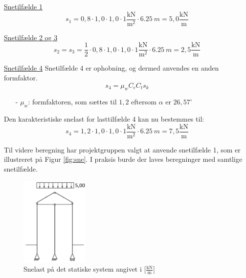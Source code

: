 \underline{Snetilfælde 1}
\begin{equation}
	s_1 = 0,\!8\cdot 1,\!0\cdot 1,\!0\cdot 1 \frac{\text{kN}}{\text{m}^2}\cdot \SI{6,25}{m} = 5,\!0 \frac{\text{kN}}{\text{m}}
\end{equation}

\underline{Snetilfælde 2 og 3}
\begin{equation}
	s_2 = s_3 = \frac{1}{2}\cdot 0,\!8 \cdot 1,\!0 \cdot 1,\!0\cdot 1 \frac{\text{kN}}{\text{m}^2}\cdot \SI{6,25}{m} = 2,\!5 \frac{\text{kN}}{\text{m}}
\end{equation}

\underline{Snetilfælde 4}
\newline
Snetilfælde 4 er ophobning, og dermed anvendes en anden formfaktor.
\begin{equation}
	s_4 = \mu_w C_e C_t s_k
\end{equation}

\begin{itemize}
	\item[-] $\mu_w$: formfaktoren, som sættes til $1,\!2$ eftersom $\alpha$ er $26,\!57^{\circ}$ \citep[ kapitel 5.3.3]{EU91}
\end{itemize}

Den karakteristiske snelast for lasttilfælde 4 kan nu bestemmes til:
\begin{equation}
	s_4 = 1,\!2\cdot 1,\!0\cdot 1,\!0\cdot 1 \frac{\text{kN}}{\text{m}^2}\cdot \SI{6,25}{m} = 7,\!5 \frac{\text{kN}}{\text{m}}
\end{equation}

Til videre beregning har projektgruppen valgt at anvende snetilfælde 1, som er illustreret på Figur \ref{fig:sne}. I praksis burde der laves beregninger med samtlige snetilfælde.

\begin{figure}[H]
	\centering
	\includegraphics[width=0.3\textwidth]{billeder/snelast.png}
	\caption{Snelast på det statiske system angivet i [$\frac{\text{kN}}{\text{m}}$]}
	\label{fig:snelast}
\end{figure}

